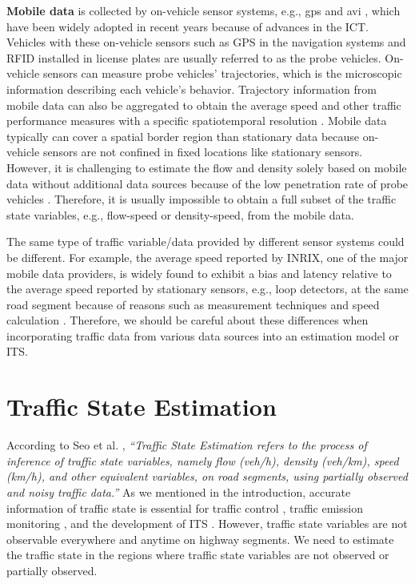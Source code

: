 \documentclass[english]{kththesis}
\begin{document}
\textbf{Mobile data} is collected by on-vehicle sensor systems, e.g., \gls{gps} and \gls{avi} \cite{seo_tse, tsanakas_emission_estimation, herrera_gps_mobile_century}, which have been widely adopted in recent years because of advances in the ICT. Vehicles with these on-vehicle sensors such as GPS in the navigation systems and RFID installed in license plates are usually referred to as the probe vehicles. On-vehicle sensors can measure probe vehicles' trajectories, which is the microscopic information describing each vehicle's behavior. Trajectory information from mobile data can also be aggregated to obtain the average speed and other traffic performance measures with a specific spatiotemporal resolution \cite{seo_tse, sharma_inrix_data_opportunity}. Mobile data typically can cover a spatial border region than stationary data because on-vehicle sensors are not confined in fixed locations like stationary sensors. However, it is challenging to estimate the flow and density solely based on mobile data without additional data sources because of the low penetration rate of probe vehicles \cite{tsanakas_emission_estimation}. Therefore, it is usually impossible to obtain a full subset of the traffic state variables, e.g., flow-speed or density-speed, from the mobile data. 

The same type of traffic variable/data provided by different sensor systems could be different. For example, the average speed reported by INRIX, one of the major mobile data providers, is widely found to exhibit a bias and latency relative to the average speed reported by stationary sensors, e.g., loop detectors, at the same road segment because of reasons such as measurement techniques and speed calculation \cite{sharma_inrix_data_opportunity, kim_inrix_data_comparing}. Therefore, we should be careful about these differences when incorporating traffic data from various data sources into an estimation model or ITS.

\section{Traffic State Estimation}
\label{sec:tse}
According to Seo et al. \cite{seo_tse}, \textit{“Traffic State Estimation refers to the process of inference of traffic state variables, namely flow (veh/h), density (veh/km), speed (km/h), and other equivalent variables, on road segments, using partially observed and noisy traffic data.”} As we mentioned in the introduction, accurate information of traffic state is essential for traffic control \cite{seo_tse}, traffic emission monitoring \cite{tsanakas_emission_estimation}, and the development of ITS \cite{seo_tse_xfcd}. However, traffic state variables are not observable everywhere and anytime on highway segments. We need to estimate the traffic state in the regions where traffic state variables are not observed or partially observed. 
\end{document}
